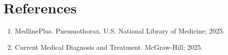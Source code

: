 \section*{References}
\begin{enumerate}
  \item MedlinePlus. Pneumothorax. U.S. National Library of Medicine; 2025.
  \item Current Medical Diagnosis and Treatment. McGraw-Hill; 2025.
\end{enumerate}

\clearpage
